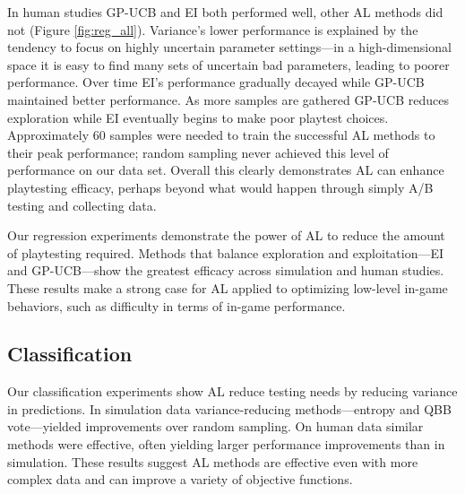 \documentclass{sig-alternate}
\begin{document}
In human studies GP-UCB and EI both performed well, other AL methods did not (Figure \ref{fig:reg_all}).
Variance's lower performance is explained by the tendency to focus on highly uncertain parameter settings---in a high-dimensional space it is easy to find many sets of uncertain bad parameters, leading to poorer performance.
Over time EI's performance gradually decayed while GP-UCB maintained better performance.
As more samples are gathered GP-UCB reduces exploration while EI eventually begins to make poor playtest choices.
Approximately 60 samples were needed to train the successful AL methods to their peak performance; random sampling never achieved this level of performance on our data set.
Overall this clearly demonstrates AL can enhance playtesting efficacy, perhaps beyond what would happen through simply A/B testing and collecting data.

Our regression experiments demonstrate the power of AL to reduce the amount of playtesting required.
Methods that balance exploration and exploitation---EI and GP-UCB---show the greatest efficacy across simulation and human studies.
These results make a strong case for AL applied to optimizing low-level in-game behaviors, such as difficulty in terms of in-game performance.


\subsection{Classification}
Our classification experiments show AL reduce testing needs by reducing variance in predictions.
In simulation data variance-reducing methods---entropy and QBB vote---yielded improvements over random sampling.
On human data similar methods were effective, often yielding larger performance improvements than in simulation.
These results suggest AL methods are effective even with more complex data and can improve a variety of objective functions.

\end{document}
